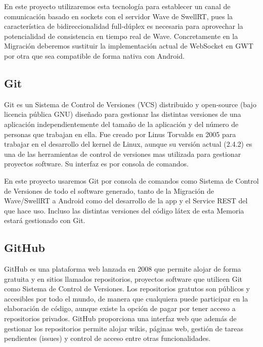 	En este proyecto utilizaremos esta tecnología para establecer un canal de comunicación basado en sockets con el servidor Wave de SwellRT, pues la característica de bidireccionalidad full-dúplex es necesaria para aprovechar la potencialidad de consistencia en tiempo real de Wave. Concretamente en la Migración deberemos sustituir la implementación actual de WebSocket en GWT por otra que sea compatible de forma nativa con Android.
    
    \subsection{Git}\label{ssec:git} 
    
	Git \cite{ref:git} es un Sistema de Control de Versiones (VCS) distribuido y open-source (bajo licencia pública GNU) diseñado para gestionar las distintas versiones de una aplicación independientemente del tamaño de la aplicación y del número de personas que trabajan en ella. Fue creado por Linus Torvalds en 2005 para trabajar en el desarrollo del kernel de Linux, aunque  su versión actual (2.4.2) es una de las herramientas  de control de versiones mas utilizada para gestionar proyectos software. Su interfaz es por consola de comandos.
	
	En este proyecto usaremos Git por consola de comandos como Sistema de Control de Versiones de todo el software generado, tanto de la Migración de Wave/SwellRT a Android como del desarrollo de la app y el Service REST del que hace uso. Incluso las distintas versiones del código látex de esta Memoria estará gestionado con Git.
     
    \subsection{GitHub}\label{ssec:github}
    
    GitHub \cite{ref:github} es una plataforma web lanzada en 2008 que permite alojar de forma gratuita y en sitios llamados repositorios, proyectos software que utilicen Git como Sistema de Control de Versiones. Los repositorios gratutos son públicos y accesibles por todo el mundo, de manera que cualquiera puede participar en la elaboración de código, aunque existe la opción de pagar por tener acceso a repositorios privados. GitHub proporciona una interfaz web que además de gestionar los repositorios permite alojar wikis, páginas web, gestión de tareas pendientes (issues) y control de acceso entre otras funcionalidades.
    
